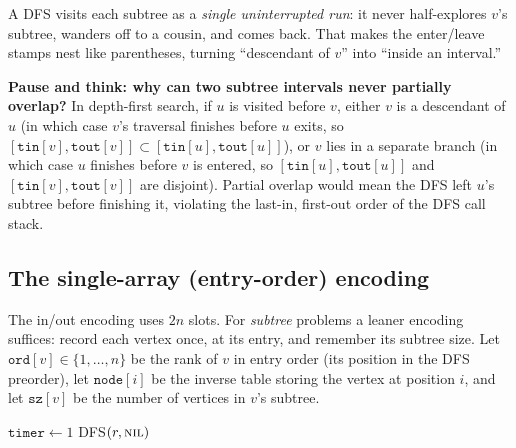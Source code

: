 \begin{whybox}
A DFS visits each subtree as a \emph{single uninterrupted run}: it never half-explores $v$'s subtree, wanders off to a
cousin, and comes back. That makes the enter/leave stamps nest like
parentheses, turning ``descendant of $v$'' into ``inside an
interval.''
\end{whybox}

\begin{recoverybox}
\textbf{Pause and think: why can two subtree intervals never partially overlap?}
In depth-first search, if $u$ is visited before $v$, either $v$ is a descendant of $u$ (in which case $v$'s traversal finishes before $u$ exits, so $[\texttt{tin}[v], \texttt{tout}[v]] \subset [\texttt{tin}[u], \texttt{tout}[u]]$), or $v$ lies in a separate branch (in which case $u$ finishes before $v$ is entered, so $[\texttt{tin}[u], \texttt{tout}[u]]$ and $[\texttt{tin}[v], \texttt{tout}[v]]$ are disjoint). Partial overlap would mean the DFS left $u$'s subtree before finishing it, violating the last-in, first-out order of the DFS call stack.
\end{recoverybox}

\subsection{The single-array (entry-order) encoding}

The in/out encoding uses $2n$ slots. For \emph{subtree} problems a leaner encoding
suffices: record each vertex once, at its entry, and remember its subtree size. Let
$\texttt{ord}[v]\in\{1,\dots,n\}$ be the rank of $v$ in entry order (its position in
the DFS preorder), let $\texttt{node}[i]$ be the inverse table storing the vertex at position $i$, and let $\texttt{sz}[v]$ be the number of vertices in $v$'s
subtree.

\begin{algorithm}[H]
\caption{Entry-order flattening with subtree sizes}
\label{ch21:alg-ord}
\DontPrintSemicolon
{}
$\texttt{timer}\leftarrow 1$\;
\textsc{DFS}$(r,\textsc{nil})$\;
\end{algorithm}

